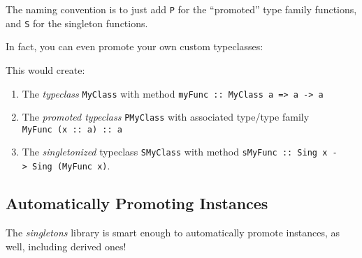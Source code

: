 \documentclass[]{article}
\newenvironment{Shaded}{}{}
\newcommand{\FunctionTok}[1]{\textcolor[rgb]{0.02,0.16,0.49}{#1}}
\newcommand{\NormalTok}[1]{#1}
\begin{document}
The naming convention is to just add \texttt{P} for the ``promoted'' type family
functions, and \texttt{S} for the singleton functions.

In fact, you can even promote your own custom typeclasses:

\begin{Shaded}
\end{Shaded}

This would create:

\begin{enumerate}
\def\labelenumi{\arabic{enumi}.}
\tightlist
\item
  The \emph{typeclass} \texttt{MyClass} with method
  \texttt{myFunc\ ::\ MyClass\ a\ =\textgreater{}\ a\ -\textgreater{}\ a}
\item
  The \emph{promoted typeclass} \texttt{PMyClass} with associated type/type
  family \texttt{MyFunc\ (x\ ::\ a)\ ::\ a}
\item
  The \emph{singletonized} typeclass \texttt{SMyClass} with method
  \texttt{sMyFunc\ ::\ Sing\ x\ -\textgreater{}\ Sing\ (MyFunc\ x)}.
\end{enumerate}

\hypertarget{automatically-promoting-instances}{%
\subsection{Automatically Promoting
Instances}\label{automatically-promoting-instances}}

The \emph{singletons} library is smart enough to automatically promote
instances, as well, including derived ones!

\begin{Shaded}
\end{Shaded}
\end{document}
